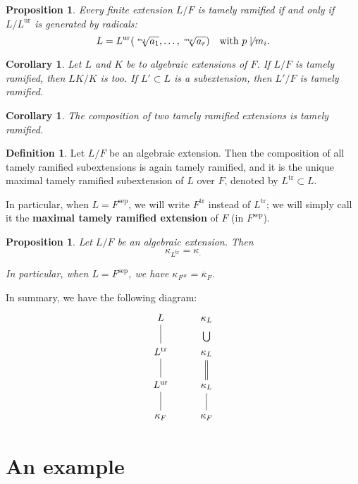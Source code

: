 \documentclass[12pt]{article}
\theoremstyle{plain}
\newtheorem{proposition}[theorem]{Proposition}
\newtheorem{corollary}[theorem]{Corollary}
\theoremstyle{definition}
\newtheorem{definition}[theorem]{Definition}
\renewcommand{\bar}[1]{\overline{#1}}
\newcommand{\sep}[1]{{#1}^{\operatorname{sep}}}
\newcommand{\ur}[1]{{#1}^{\operatorname{ur}}}
\newcommand{\tr}[1]{{#1}^{\operatorname{tr}}}
\begin{document}
\begin{proposition}\label{proposition:how are the tamely ramified extensions of a field F - they are generated by the radicals}
Every finite extension $L/F$ is tamely ramified if and only if $L/\ur L $ is generated by radicals:
\[
    L = \ur L (\sqrt[m_1]{a_1} , \ldots, \sqrt[m_r]{a_r}) \quad \text{with $p \not \mid m_i$}.
\]
\end{proposition}

\begin{corollary}
Let $L$ and $K$ be to algebraic extensions of $F$. If $L/F$ is tamely ramified, then $LK /K$ is too. If $L' \subset L$ is a subextension, then $L' /F$ is tamely ramified.
\end{corollary}

\begin{corollary}
The composition of two tamely ramified extensions is tamely ramified.
\end{corollary}



\begin{definition}
Let $L/F$ be an algebraic extension. Then the composition of all tamely ramified subextensions is again tamely ramified, and it is the unique maximal tamely ramified subextension of $L$ over $F$, denoted by $\tr L \subset L$.

In particular, when $L = \sep F$, we will write $\tr F$ instead of $\tr L$; we will simply call it the \textbf{maximal tamely ramified extension} of $F$ (in $\sep F$).
\end{definition}

\begin{proposition}
Let $L/F$ be an algebraic extension. Then
\[
    \kappa_{\tr L} = \kappa _.
\]

In particular, when $L = \sep F$, we have $\kappa_{\ur F} = \bar \kappa_F$.
\end{proposition}

In summary, we have the following diagram:
\[
\begin{tikzcd}
    L \ar[d, no head]& \kappa_L \ar[d, "\bigcup", phantom]\\
    \tr L \ar[d, no head]& \kappa_L \ar[d, Rightarrow, no head] \\
    \ur L \ar[d, no head]& \kappa_L \ar[d, no head]\\
    \kappa_F & \kappa_F
\end{tikzcd}
\]

\section{An example}
\end{document}
